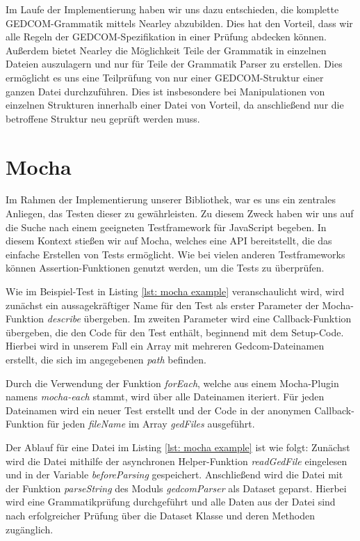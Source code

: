 Im Laufe der Implementierung haben wir uns dazu entschieden, die komplette GEDCOM-Grammatik mittels Nearley abzubilden. Dies hat den Vorteil, dass wir 
alle Regeln der GEDCOM-Spezifikation in einer Prüfung abdecken können. Außerdem bietet Nearley die Möglichkeit Teile der Grammatik in einzelnen Dateien
auszulagern und nur für Teile der Grammatik Parser zu erstellen. Dies ermöglicht es uns eine Teilprüfung von nur einer GEDCOM-Struktur einer
ganzen Datei durchzuführen. Dies ist insbesondere bei Manipulationen von einzelnen Strukturen innerhalb einer Datei von Vorteil, da anschließend
nur die betroffene Struktur neu geprüft werden muss.


\section{Mocha}
\label{sec: Mocha}

Im Rahmen der Implementierung unserer Bibliothek, war es uns ein zentrales Anliegen, das Testen dieser zu gewährleisten. Zu diesem Zweck haben wir uns auf die Suche nach einem geeigneten Testframework für JavaScript begeben. In diesem Kontext stießen wir auf Mocha, welches eine API bereitstellt, die das einfache Erstellen von Tests ermöglicht. Wie bei vielen anderen Testframeworks können Assertion-Funktionen genutzt werden, um die Tests zu überprüfen.

Wie im Beispiel-Test in Listing \ref{lst: mocha example} veranschaulicht wird, wird zunächst ein aussagekräftiger Name für den Test als erster Parameter der Mocha-Funktion \textit{describe} übergeben. Im zweiten Parameter wird eine Callback-Funktion übergeben, die den Code für den Test enthält, beginnend mit dem Setup-Code. Hierbei wird in unserem Fall ein Array mit mehreren Gedcom-Dateinamen erstellt, die sich im angegebenen \textit{path} befinden.

Durch die Verwendung der Funktion \textit{forEach}, welche aus einem Mocha-Plugin namens \textit{mocha-each} stammt, wird über alle Dateinamen iteriert. Für jeden Dateinamen wird ein neuer Test erstellt und der Code in der anonymen Callback-Funktion für jeden \textit{fileName} im Array \textit{gedFiles} ausgeführt.

Der Ablauf für eine Datei im Listing \ref{lst: mocha example} ist wie folgt: Zunächst wird die Datei mithilfe der asynchronen Helper-Funktion \textit{readGedFile} eingelesen und in der Variable \textit{beforeParsing} gespeichert. Anschließend wird die Datei mit der Funktion \textit{parseString} des Moduls \textit{gedcomParser} als Dataset geparst. Hierbei wird eine Grammatikprüfung durchgeführt und alle Daten aus der Datei sind nach erfolgreicher Prüfung über die Dataset Klasse und deren Methoden zugänglich.

